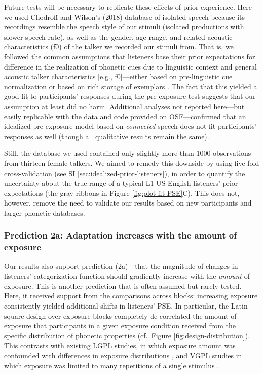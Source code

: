 \documentclass[
  11pt,
  man,mask,floatsintext]{apa6}
\begin{document}
Future tests will be necessary to replicate these effects of prior experience. Here we used Chodroff and Wilson's (2018) database of isolated speech because its recordings resemble the speech style of our stimuli (isolated productions with slower speech rate), as well as the gender, age range, and related acoustic characteristics (f0) of the talker we recorded our stimuli from. That is, we followed the common assumptions that listeners base their prior expectations for difference in the realization of phonetic cues due to linguistic context \autocites[e.g., speech rate, in line with][]{allen-miller1999,miller-dexter1988,utman1998} and general acoustic talker characteristics {[}e.g., f0{]}---either based on pre-linguistic cue normalization or based on rich storage of exemplars \autocites[for relevant discussion, see][]{apfelbaum-mcmurray2015,baeseberk2014,dilley-pitt2010,johnson1997,johnson-sjerps2021,toscano-mcmurray2012}. The fact that this yielded a good fit to participants' responses during the pre-exposure test suggests that our assumption at least did no harm. Additional analyses not reported here---but easily replicable with the data and code provided on OSF---confirmed that an idealized pre-exposure model based on \emph{connected} speech does not fit participants' responses as well (though all qualitative results remain the same).

Still, the database we used contained only slightly more than 1000 observations from thirteen female talkers. We aimed to remedy this downside by using five-fold cross-validation (see SI \ref{sec:idealized-prior-listeners}), in order to quantify the uncertainty about the true range of a typical L1-US English listeners' prior expectations (the gray ribbons in Figure \ref{fig:plot-fit-PSE}C). This does not, however, remove the need to validate our results based on new participants and larger phonetic databases.

\subsubsection{Prediction 2a: Adaptation increases with the amount of exposure}\label{prediction-2a-adaptation-increases-with-the-amount-of-exposure}

Our results also support prediction (2a)---that the magnitude of changes in listeners' categorization function should gradiently increase with the \emph{amount} of exposure. This is another prediction that is often assumed but rarely tested. Here, it received support from the comparisons across blocks: increasing exposure consistently yielded additional shifts in listeners' PSE. In particular, the Latin-square design over exposure blocks completely de-correlated the amount of exposure that participants in a given exposure condition received from the specific distribution of phonetic properties (cf.~Figure \ref{fig:design-distribution}). This contrasts with existing LGPL studies, in which exposure amount was confounded with differences in exposure distributions \autocite{cummings-theodore2023,liu-jaeger2018,liu-jaeger2019}, and VGPL studies in which exposure was limited to many repetitions of a single stimulus \autocites[e.g.,][]{kleinschmidt-jaeger2012,vroomen2007}.
\end{document}
